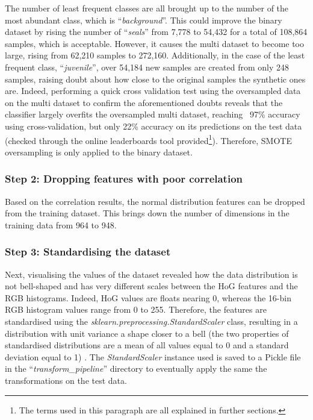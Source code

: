 \documentclass[letterpaper,12pt]{article}
\begin{document}
The number of least frequent classes are all brought up to the number of the most abundant class, which is ``\textit{background}''. This could improve the binary dataset by rising the number of ``\textit{seals}'' from 7,778  to 54,432  for a total of 108,864 samples, which is acceptable. However, it causes the multi dataset to become too large, rising from 62,210 samples to 272,160. Additionally, in the case of the least frequent class, ``\textit{juvenile}'', over 54,184 new samples are created from only 248 samples, raising doubt about how close to the original samples the synthetic ones are. Indeed, performing a quick cross validation test using the oversampled data on the multi dataset to confirm the aforementioned doubts reveals that the classifier largely overfits the oversampled multi dataset, reaching ~97\% accuracy using cross-validation, but only 22\% accuracy on its predictions on the test data (checked through the online leaderboards tool provided\footnote{The terms used in this paragraph are all explained in further sections.}). Therefore, SMOTE oversampling is only applied to the binary dataset.

\subsubsection{Step 2: Dropping features with poor correlation}
\label{sec:drop-poor-features}

Based on the correlation results, the normal distribution features can be dropped from the training dataset. This brings down the number of dimensions in the training data from 964 to 948.\\

\subsubsection{Step 3: Standardising the dataset}
\label{sec:standard-scaling}

Next, visualising the values of the dataset revealed how the data distribution is not bell-shaped and has very different scales between the HoG features and the RGB histograms. Indeed, HoG values are floats nearing 0, whereas the 16-bin RGB histogram values range from 0 to 255. Therefore, the features are standardised using the \textit{sklearn.preprocessing.StandardScaler} class, resulting in a distribution with unit variance a shape closer to a bell (the two properties of standardised distributions are a mean of all values equal to 0 and a standard deviation equal to 1) \cite{Geron2019}\cite{Glen2014}. The \textit{StandardScaler} instance used is saved to a Pickle file in the ``\textit{transform\_pipeline}'' directory to eventually apply the same the transformations on the test data.
\end{document}
